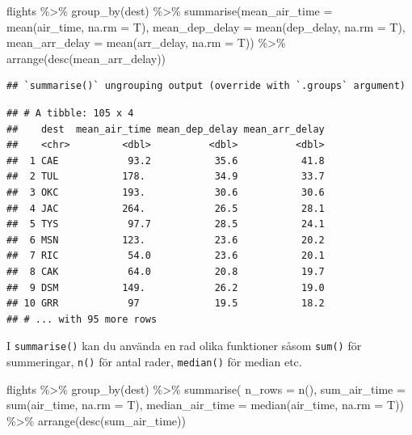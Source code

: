 \documentclass[
]{book}
\newenvironment{Shaded}{\begin{snugshade}}{\end{snugshade}}
\newcommand{\AttributeTok}[1]{\textcolor[rgb]{0.77,0.63,0.00}{#1}}
\newcommand{\FunctionTok}[1]{\textcolor[rgb]{0.00,0.00,0.00}{#1}}
\newcommand{\NormalTok}[1]{#1}
\newcommand{\SpecialCharTok}[1]{\textcolor[rgb]{0.00,0.00,0.00}{#1}}
\begin{document}
\begin{Shaded}
\begin{Highlighting}[]
\NormalTok{flights }\SpecialCharTok{\%\textgreater{}\%} 
  \FunctionTok{group\_by}\NormalTok{(dest) }\SpecialCharTok{\%\textgreater{}\%}
  \FunctionTok{summarise}\NormalTok{(}\AttributeTok{mean\_air\_time =} \FunctionTok{mean}\NormalTok{(air\_time, }\AttributeTok{na.rm =}\NormalTok{ T),}
          \AttributeTok{mean\_dep\_delay =} \FunctionTok{mean}\NormalTok{(dep\_delay, }\AttributeTok{na.rm =}\NormalTok{ T),}
          \AttributeTok{mean\_arr\_delay =} \FunctionTok{mean}\NormalTok{(arr\_delay, }\AttributeTok{na.rm =}\NormalTok{ T)) }\SpecialCharTok{\%\textgreater{}\%} 
  \FunctionTok{arrange}\NormalTok{(}\FunctionTok{desc}\NormalTok{(mean\_arr\_delay))}
\end{Highlighting}
\end{Shaded}

\begin{verbatim}
## `summarise()` ungrouping output (override with `.groups` argument)
\end{verbatim}

\begin{verbatim}
## # A tibble: 105 x 4
##    dest  mean_air_time mean_dep_delay mean_arr_delay
##    <chr>         <dbl>          <dbl>          <dbl>
##  1 CAE            93.2           35.6           41.8
##  2 TUL           178.            34.9           33.7
##  3 OKC           193.            30.6           30.6
##  4 JAC           264.            26.5           28.1
##  5 TYS            97.7           28.5           24.1
##  6 MSN           123.            23.6           20.2
##  7 RIC            54.0           23.6           20.1
##  8 CAK            64.0           20.8           19.7
##  9 DSM           149.            26.2           19.0
## 10 GRR            97             19.5           18.2
## # ... with 95 more rows
\end{verbatim}

I \texttt{summarise()} kan du använda en rad olika funktioner såsom \texttt{sum()} för summeringar, \texttt{n()} för antal rader, \texttt{median()} för median etc.

\begin{Shaded}
\begin{Highlighting}[]
\NormalTok{flights }\SpecialCharTok{\%\textgreater{}\%} 
 \FunctionTok{group\_by}\NormalTok{(dest) }\SpecialCharTok{\%\textgreater{}\%} 
  \FunctionTok{summarise}\NormalTok{(}
    \AttributeTok{n\_rows =} \FunctionTok{n}\NormalTok{(),}
    \AttributeTok{sum\_air\_time =} \FunctionTok{sum}\NormalTok{(air\_time, }\AttributeTok{na.rm =}\NormalTok{ T),}
    \AttributeTok{median\_air\_time =} \FunctionTok{median}\NormalTok{(air\_time, }\AttributeTok{na.rm =}\NormalTok{ T)) }\SpecialCharTok{\%\textgreater{}\%} 
  \FunctionTok{arrange}\NormalTok{(}\FunctionTok{desc}\NormalTok{(sum\_air\_time))}
\end{Highlighting}
\end{Shaded}
\end{document}
